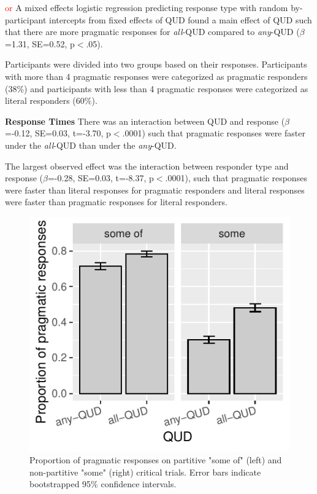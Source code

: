 \documentclass[10pt,letterpaper]{article}
\begin{document}
\textcolor{red}{or} 
A mixed effects logistic regression predicting response type with random by-participant intercepts from fixed effects of QUD found a main effect of QUD such that there are more pragmatic responses for \textit{all}-QUD compared to \textit{any}-QUD ($\beta$=1.31, SE=0.52, p$<$.05).

Participants were divided into two groups based on their responses. Participants with more than 4 pragmatic responses were categorized as pragmatic responders (38\%) and participants with less than 4 pragmatic responses were categorized as literal responders (60\%).

\noindent \textbf{Response Times} 
There was an interaction between QUD and response ($\beta$=-0.12, SE=0.03, t=-3.70, p$<$.0001) such that pragmatic responses were faster under the \textit{all}-QUD than under the \textit{any}-QUD. 

The largest observed effect was the interaction between responder type and response ($\beta$=-0.28, SE=0.03, t=-8.37, p$<$.0001), such that pragmatic responses were faster than literal responses for pragmatic responders and literal responses were faster than pragmatic responses for literal responders.

\begin{figure}
\includegraphics[width=\columnwidth]{plots/judgements.pdf}
\caption{Proportion of pragmatic responses on partitive "some of" (left) and non-partitive "some" (right) critical trials. Error bars indicate bootstrapped 95\% confidence intervals. \label{fig:judgements}}
\end{figure}
\end{document}
